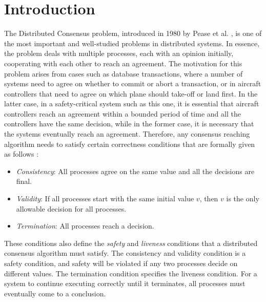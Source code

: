 ﻿\section{Introduction}

The Distributed Consensus problem, introduced in 1980 by Pease et al. \cite{PeaseSL80}, is one of the most important and well-studied problems in distributed systems. In essence, the problem deals with multiple processes, each with an opinion initially, cooperating with each other to reach an agreement. The motivation for this problem arises from cases such as database transactions, where a number of systems need to agree on whether to commit or abort a transaction, or in aircraft controllers that need to agree on which plane should take-off or land first. In the latter case, in a safety-critical system such as this one, it is essential that aircraft controllers reach an agreement within a bounded period of time and all the controllers have the same decision, while in the former case, it is necessary that the systems eventually reach an agreement. Therefore, any consensus reaching algorithm needs to satisfy certain correctness conditions that are formally given as follows \cite{PeaseSL80}:

\begin{itemize}
    \item \textit{Consistency}: All processes agree on the same value and all the decisions are final.
    \item \textit{Validity}: If all processes start with the same initial value $v$, then $v$ is the only allowable decision for all processes.
    \item \textit{Termination}: All processes reach a decision.
\end{itemize}


These conditions also define the \textit{safety} and \textit{liveness} conditions that a distributed consensus algorithm must satisfy.  The consistency and validity condition is a safety condition, and safety will be violated if any two processes decide on different values. The termination condition specifies the liveness condition. For a system to continue executing correctly until it terminates, all processes must eventually come to a conclusion.

